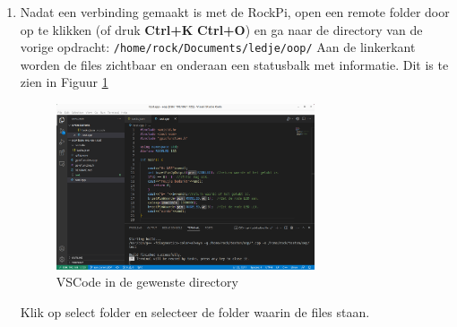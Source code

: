 \begin{enumerate}
      \item Nadat een verbinding gemaakt is met de RockPi, open een remote folder door op  te klikken (of druk \textbf{Ctrl+K} \textbf{Ctrl+O}) en ga naar de directory van de vorige opdracht: \texttt{/home/rock/Documents/ledje/oop/} \newline
      Aan de linkerkant worden de files zichtbaar en onderaan een statusbalk met informatie. Dit is te zien in Figuur \ref{fig:vncOp}
  		\begin{figure}[h!]
  	\centering
  	\begin{center} 	
  		\includegraphics[width=0.72\textwidth]{figuren/vncSchermOp1}
  		\caption{VSCode in de gewenste directory}
  		\label{fig:vncOp}   
  	\end{center}
  \end{figure}    

\newpage
Klik op select folder  %
en selecteer de folder waarin de files staan. 



\end{enumerate}
